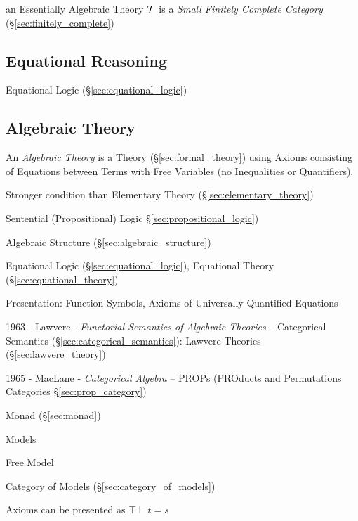 an Essentially Algebraic Theory $\mathcal{T}$ is a \emph{Small Finitely
  Complete Category} (\S\ref{sec:finitely_complete})



\subsection{Equational Reasoning}\label{sec:equational_reasoning}

Equational Logic (\S\ref{sec:equational_logic})



\subsection{Algebraic Theory}\label{sec:algebraic_theory}

An \emph{Algebraic Theory} is a Theory (\S\ref{sec:formal_theory})
using Axioms consisting of Equations between Terms with Free Variables
(no Inequalities or Quantifiers).

Stronger condition than Elementary Theory
(\S\ref{sec:elementary_theory})

Sentential (Propositional) Logic \S\ref{sec:propositional_logic})

Algebraic Structure (\S\ref{sec:algebraic_structure})

Equational Logic (\S\ref{sec:equational_logic}),
Equational Theory (\S\ref{sec:equational_theory})

Presentation: Function Symbols, Axioms of Universally Quantified
Equations

1963 - Lawvere - \emph{Functorial Semantics of Algebraic Theories} --
Categorical Semantics (\S\ref{sec:categorical_semantics}): Lawvere Theories
(\S\ref{sec:lawvere_theory})

1965 - MacLane - \emph{Categorical Algebra} -- PROPs (PROducts and Permutations
Categories \S\ref{sec:prop_category})

Monad (\S\ref{sec:monad})

Models

Free Model

Category of Models (\S\ref{sec:category_of_models})

Axioms can be presented as $\top \vdash t = s$


